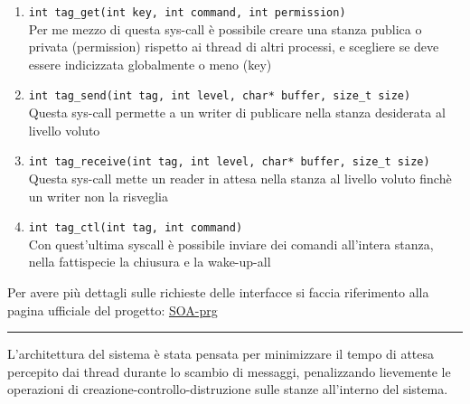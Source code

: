 \begin{enumerate}
    \item \verb|int tag_get(int key, int command, int permission)|\\
    Per me mezzo di questa sys-call è possibile creare una stanza publica o privata (permission)
    rispetto ai thread di altri processi, e scegliere se deve essere indicizzata globalmente o meno (key)
    \item \verb|int tag_send(int tag, int level, char* buffer, size_t size)|\\
    Questa sys-call permette a un writer di publicare nella stanza desiderata al livello voluto
    \item \verb|int tag_receive(int tag, int level, char* buffer, size_t size)|\\
    Questa sys-call mette un reader in attesa nella stanza al livello voluto finchè un writer non la risveglia
    \item \verb|int tag_ctl(int tag, int command)|\\
    Con quest'ultima syscall è possibile inviare dei comandi all'intera stanza, nella fattispecie la chiusura e la wake-up-all
\end{enumerate}
Per avere più dettagli sulle richieste delle interfacce si faccia riferimento alla pagina ufficiale del progetto:
\href{https://francescoquaglia.github.io/TEACHING/AOS/PROJECTS/project-specification-2020-2021.html}{SOA-prg}

\rule{\textwidth}{0.2pt}

L'architettura del sistema è stata pensata per minimizzare il tempo di attesa percepito dai thread durante lo scambio di messaggi,
penalizzando lievemente le operazioni di creazione-controllo-distruzione sulle stanze all'interno del sistema.
